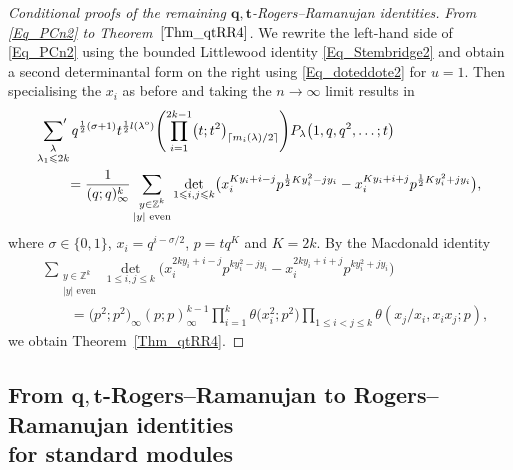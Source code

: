 \documentclass[pdftex]{sigma}
\numberwithin{equation}{section}
\renewcommand{\leq}{\leqslant}
\newcommand{\ceil}[1]{\lceil#1\rceil}
\newcommand{\abs}[1]{\vert#1\vert}
\newcommand{\la}{\lambda}
\begin{document}
\begin{proof}[Conditional proofs of the remaining $\boldsymbol{q,t}$-Rogers--Ramanujan
identities]
\textit{From \eqref{Eq_PCn2} to Theorem~$\ref{Thm_qtRR4}$.}
We rewrite the left-hand side of \eqref{Eq_PCn2} using the bounded
Littlewood identity \eqref{Eq_Stembridge2} and obtain a
second determinantal form on the right using
\eqref{Eq_doteddote2} for $u=1$.
Then specialising the $x_i$ as before and taking the $n\to\infty$ limit
results in
\begin{align*}
&\sideset{}{'}\sum_{\substack{\la \\[1pt] \la_1\leq 2k}}
q^{\frac{1}{2}(\sigma+1)}t^{\frac{1}{2}l(\la^{\textup{o}})}
\Biggl(\prod_{i=1}^{2k-1}\bigl(t;t^2\bigr)_{\ceil{m_i(\la)/2}}\Biggr)
P_{\la}\bigl(1,q,q^2,\dots;t\bigr) \\
&\qquad = \frac{1}{(q;q)_{\infty}^k}
\sum_{\substack{y\in\mathbb{Z}^k\\[1pt] \abs{y} \text{ even}}}
\det_{1\leq i,j\leq k}\bigl(
x_i^{Ky_i+i-j} p^{\frac{1}{2}Ky_i^2-jy_i}-
x_i^{Ky_i+i+j} p^{\frac{1}{2}Ky_i^2+jy_i}\bigr),
\end{align*}
where $\sigma\in\{0,1\}$, $x_i=q^{i-\sigma/2}$, $p=tq^K$ and
$K=2k$.
By the  Macdonald identity \cite{Macdonald72}
\begin{align*}
&\sum_{\substack{y\in\mathbb{Z}^k\\[1pt] \abs{y} \text{ even}}}
\det_{1\leq i,j\leq k}\bigl(
x_i^{2ky_i+i-j} p^{ky_i^2-jy_i}-
x_i^{2ky_i+i+j} p^{ky_i^2+jy_i}\bigr) \\
&\qquad=\bigl(p^2;p^2\bigr)_{\infty}(p;p)_{\infty}^{k-1}
\prod_{i=1}^k \theta\bigl(x_i^2;p^2\bigr)
\prod_{1\leq i<j\leq k} \theta(x_j/x_i,x_ix_j;p),
\end{align*}
we obtain Theorem~\ref{Thm_qtRR4}.
\end{proof}

\subsection[From q,t-Rogers--Ramanujan to Rogers--Ramanujan identities for standard modules]{From $\boldsymbol{q,t}$-Rogers--Ramanujan to Rogers--Ramanujan identities\\
for standard modules}\label{Sec_standard}
\end{document}
